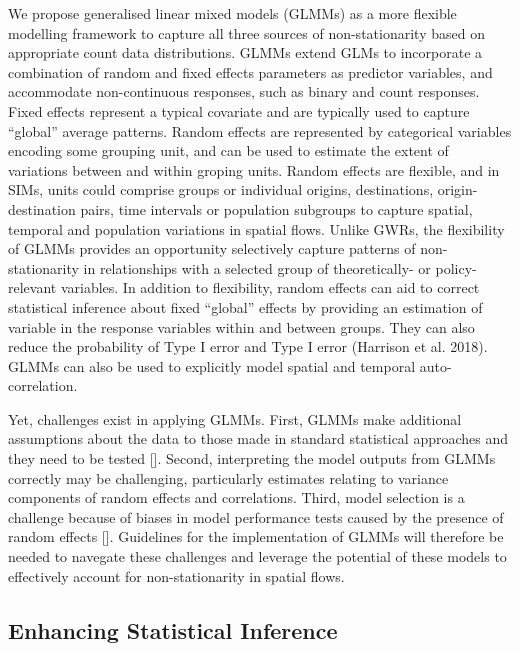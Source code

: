 \documentclass[11pt,letterpaper]{article}
\begin{document}
We propose generalised linear mixed models (GLMMs) as a more flexible modelling framework to capture all three sources of non-stationarity based on appropriate count data distributions.
GLMMs extend GLMs to incorporate a combination of random and fixed effects parameters as predictor variables, and accommodate non-continuous responses, such as binary and count responses.
Fixed effects represent a typical covariate and are typically used to capture ``global'' average patterns.
Random effects are represented by categorical variables encoding some grouping unit, and can be used to estimate the extent of variations between and within groping units.
Random effects are flexible, and in SIMs, units could comprise groups or individual origins, destinations, origin-destination pairs, time intervals or population subgroups to capture spatial, temporal and population variations in spatial flows.
Unlike GWRs, the flexibility of GLMMs provides an opportunity selectively capture patterns of non-stationarity in relationships with a selected group of theoretically- or policy-relevant variables.
In addition to flexibility, random effects can aid to correct statistical inference about fixed ``global'' effects by providing an estimation of variable in the response variables within and between groups.
They can also reduce the probability of Type I error and Type I error (Harrison et al. 2018).
GLMMs can also be used to explicitly model spatial and temporal auto-correlation.

Yet, challenges exist in applying GLMMs.
First, GLMMs make additional assumptions about the data to those made in standard statistical approaches and they need to be tested {[}{]}.
Second, interpreting the model outputs from GLMMs correctly may be challenging, particularly estimates relating to variance components of random effects and correlations.
Third, model selection is a challenge because of biases in model performance tests caused by the presence of random effects {[}{]}.
Guidelines for the implementation of GLMMs will therefore be needed to navegate these challenges and leverage the potential of these models to effectively account for non-stationarity in spatial flows.

\hypertarget{enhancing-statistical-inference}{%
\subsection{Enhancing Statistical Inference}\label{enhancing-statistical-inference}}
\end{document}
